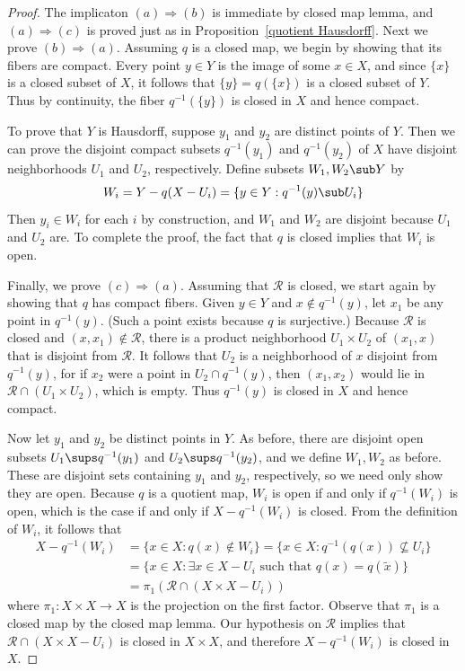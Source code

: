 \begin{proof}
The implicaton $(a)\Rightarrow(b)$ is immediate by closed map lemma, and $(a)\Rightarrow(c)$ is proved just as in Proposition~\ref{quotient Hausdorff}. Next we prove $(b)\Rightarrow(a)$. Assuming $q$ is a closed map, we begin by showing that its fibers are compact. Every point $y\in Y$ is the image of some $x\in X$, and since $\{x\}$ is a closed subset of $X$, it follows that $\{y\}=q(\{x\})$ is a closed subset of $Y$. Thus by continuity, the fiber $q^{-1}(\{y\})$ is closed in $X$ and hence compact.\par 
To prove that $Y$ is Hausdorff, suppose $y_1$ and $y_2$ are distinct points of $Y$. Then we can prove the disjoint compact subsets $q^{-1}(y_1)$ and $q^{-1}(y_2)$ of $X$ have disjoint neighborhoods $U_1$ and $U_2$, respectively. Define subsets $W_1,W_2\sub Y$ by
\[W_i=Y-q(X-U_i)=\{y\in Y:q^{-1}(y)\sub U_i\}\]
Then $y_i\in W_i$ for each $i$ by construction, and $W_1$ and $W_2$ are disjoint because $U_1$ and $U_2$ are. To complete the proof, the fact that $q$ is closed implies that $W_i$ is open.\par
Finally, we prove $(c)\Rightarrow(a)$. Assuming that $\mathcal{R}$ is closed, we start again by showing that $q$ has compact fibers. Given $y\in Y$ and $x\notin q^{-1}(y)$, let $x_1$ be any point in $q^{-1}(y)$. (Such a point exists because $q$ is surjective.) Because $\mathcal{R}$ is closed and $(x,x_1)\notin\mathcal{R}$, there is a product neighborhood $U_1\times U_2$ of $(x_1,x)$ that is disjoint from $\mathcal{R}$. It follows that $U_2$ is a neighborhood of $x$ disjoint from $q^{-1}(y)$, for if $x_2$ were a point in $U_2\cap q^{-1}(y)$, then $(x_1,x_2)$ would lie in $\mathcal{R}\cap(U_1\times U_2)$, which is empty. Thus $q^{-1}(y)$ is closed in $X$ and hence compact.\par
Now let $y_1$ and $y_2$ be distinct points in $Y$. As before, there are disjoint open
subsets $U_1\sups q^{-1}(y_1)$ and $U_2\sups q^{-1}(y_2)$, and we define $W_1,W_2$ as before. These are disjoint sets containing $y_1$ and $y_2$, respectively, so we need only show they are open. Because $q$ is a quotient map, $W_i$ is open if and only if $q^{-1}(W_i)$ is open, which is the case if and only if $X-q^{-1}(W_i)$ is closed. From the definition of $W_i$, it follows that
\begin{align*}
X-q^{-1}(W_i)&=\{x\in X:q(x)\notin W_i\}=\{x\in X:q^{-1}(q(x))\nsubseteq U_i\}\\
&=\{x\in X:\text{$\exists x\in X-U_i$ such that $q(x)=q(\tilde{x})$}\}\\
&=\pi_1(\mathcal{R}\cap(X\times X-U_i))
\end{align*}
where $\pi_1:X\times X\to X$ is the projection on the first factor. Observe that $\pi_1$ is a closed map by the closed map lemma. Our hypothesis on $\mathcal{R}$ implies that $\mathcal{R}\cap(X\times X-U_i)$ is closed in $X\times X$, and therefore $X-q^{-1}(W_i)$ is closed in $X$.
\end{proof}
